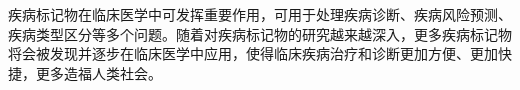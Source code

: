 



疾病标记物在临床医学中可发挥重要作用，可用于处理疾病诊断、疾病风险预测、疾病类型区分等多个问题。随着对疾病标记物的研究越来越深入，更多疾病标记物将会被发现并逐步在临床医学中应用，使得临床疾病治疗和诊断更加方便、更加快捷，更多造福人类社会。

